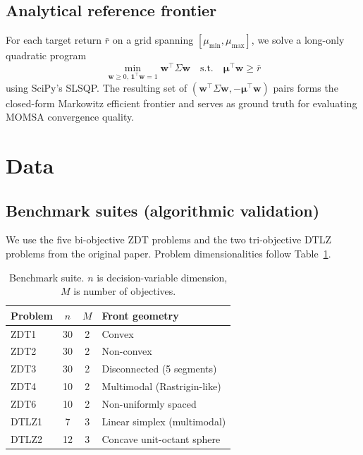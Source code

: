 \documentclass[11pt,a4paper]{article}
\begin{document}
\subsection{Analytical reference frontier}

For each target return $\bar{r}$ on a grid spanning
$[\mu_{\min}, \mu_{\max}]$, we solve a long-only quadratic program
\begin{equation}
\min_{\mathbf{w}\geq 0,\,\mathbf{1}^\top\mathbf{w}=1} \mathbf{w}^\top \Sigma \mathbf{w}
\quad\text{s.t.}\quad \bm{\mu}^\top \mathbf{w} \geq \bar{r}
\label{eq:qp}
\end{equation}
using SciPy's SLSQP. The resulting set of $(\mathbf{w}^\top\Sigma\mathbf{w},
-\bm{\mu}^\top\mathbf{w})$ pairs forms the closed-form Markowitz
efficient frontier and serves as ground truth for evaluating MOMSA
convergence quality.

\section{Data}
\label{sec:data}

\subsection{Benchmark suites (algorithmic validation)}

We use the five bi-objective ZDT problems \cite{zitzler2000zdt} and the
two tri-objective DTLZ problems \cite{deb2005dtlz} from the original
paper. Problem dimensionalities follow Table~\ref{tab:bench-suite}.

\begin{table}[h]
\centering
\small
\begin{tabular}{lccl}
\toprule
Problem & $n$ & $M$ & Front geometry \\
\midrule
ZDT1   & 30  & 2 & Convex \\
ZDT2   & 30  & 2 & Non-convex \\
ZDT3   & 30  & 2 & Disconnected (5 segments) \\
ZDT4   & 10  & 2 & Multimodal (Rastrigin-like) \\
ZDT6   & 10  & 2 & Non-uniformly spaced \\
DTLZ1  & 7   & 3 & Linear simplex (multimodal) \\
DTLZ2  & 12  & 3 & Concave unit-octant sphere \\
\bottomrule
\end{tabular}
\caption{Benchmark suite. $n$ is decision-variable dimension, $M$ is
number of objectives.}
\label{tab:bench-suite}
\end{table}
\end{document}
